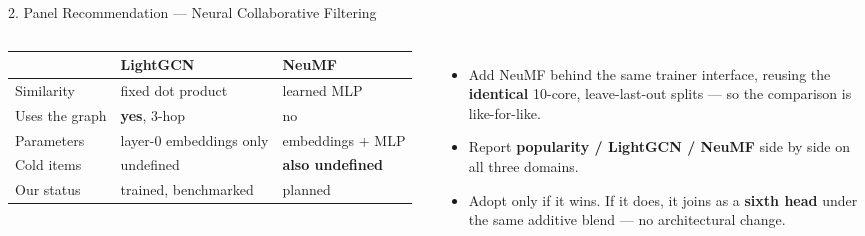 \begin{frame}[shrink]{2. Panel Recommendation --- Neural Collaborative Filtering}
\begin{columns}[T]
{\scriptsize
\renewcommand{\arraystretch}{1.30}
\begin{tabular}{L{2.05cm} L{2.0cm} L{1.85cm}}
\toprule
 & \textbf{LightGCN} & \textbf{NeuMF}\\
\midrule
Similarity      & fixed dot product        & learned MLP\\
Uses the graph  & \textbf{yes}, 3-hop      & no\\
Parameters      & layer-0 embeddings only  & embeddings + MLP\\
Cold items      & undefined                & \textbf{also undefined}\\
Our status      & trained, benchmarked     & planned\\
\bottomrule
\end{tabular}}
\vspace{2.5mm}

\begin{itemize}\scriptsize\setlength{\itemsep}{3.5pt}
  \item Add NeuMF behind the same trainer interface, reusing the \textbf{identical} 10-core,
        leave-last-out splits --- so the comparison is like-for-like.
  \item Report \textbf{popularity / LightGCN / NeuMF} side by side on all three domains.
  \item Adopt only if it wins. If it does, it joins as a \textbf{sixth head} under the same additive
        blend --- no architectural change.
\end{itemize}
\end{columns}
\end{frame}


